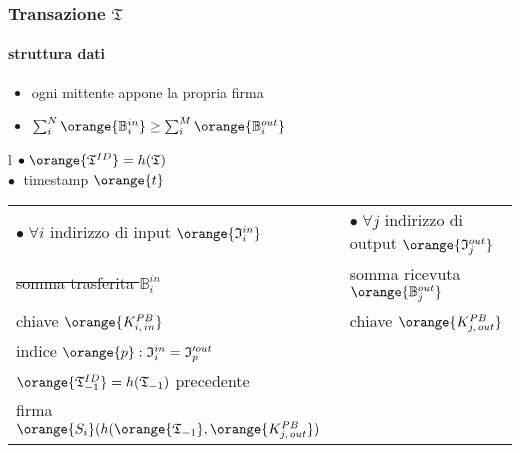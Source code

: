\begin{frame}
	\frametitle{Transazione $\mathfrak{T}$}
	\framesubtitle{struttura dati}
	
	\begin{itemize}
		\item ogni mittente appone la propria firma 
		\item $\sum_i^N \orange{\mathbb{B}_i^{in}} \geq \sum_i^M \orange{\mathbb{B}_i^{out}}$
	\end{itemize}
	
	\begin{table}
	  \centering
	  \begin{tabular}{l}
	    \midrule \midrule
	    $\bullet\;\orange{\mathfrak{T}^{ID}}=h(\mathfrak{T})$\\
	    $\bullet\;$ timestamp $\orange{t}$ \\
	    \begin{tabular}{l|l}
			$\bullet\;\forall i$ indirizzo di {\color{blue}input}  $\orange{\mathfrak{I}_i^{in}}$ & 
			$\bullet\;\forall j$ indirizzo di {\color{blue}output} $\orange{\mathfrak{I}_j^{out}}$ \\
			\tabitem \sout{somma trasferita $\mathbb{B}_i^{in}$} & \tabitem somma ricevuta $\orange{\mathbb{B}_j^{out}}$ \\
			\tabitem chiave $\orange{K^{PB}_{i,\,in}}$ & \tabitem chiave $\orange{K^{PB}_{j,\,out}}$ \\
			\tabitem indice $\orange{p}: \mathfrak{I}_i^{in}=\mathfrak{I}_p^{\prime out}$ \\
			\tabitem $\orange{\mathfrak{T}^{ID}_{-1}}=h(\mathfrak{T}_{-1})$ precedente \\
			\tabitem firma $\orange{S_{i}}(h(\orange{\mathfrak{T}_{-1}}, \orange{K^{PB}_{j,\,out}})$	
		\end{tabular}		
	  \end{tabular}
	\end{table}

\end{frame}